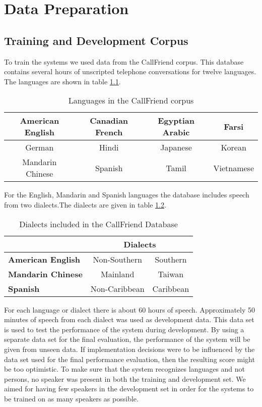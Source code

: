 \chapter{Data Preparation}

\section{Training and Development Corpus}

To train the systems we used data from the CallFriend corpus. This database contains several hours of unscripted telephone conversations for twelve languages. The languages are shown in table \ref{tab:callfriend}.
\begin{table}[hbt]
	\begin{center}
	\caption{Languages in the CallFriend corpus}
	\begin{tabular}{ | c | c | c | c |}
	\hline
	American English & Canadian French & Egyptian Arabic & Farsi \\ \hline
	German & Hindi & Japanese & Korean \\ \hline
	Mandarin Chinese & Spanish & Tamil & Vietnamese \\ \hline
	\hline
	\end{tabular}
	\label{tab:callfriend}
	\end{center}
\end{table}
For the English, Mandarin and Spanish languages the database includes speech from two dialects.The dialects are given in table \ref{tab:callfrienddial}.
\begin{table}[hbt]
	\begin{center}
	\caption{Dialects included in the CallFriend Database}
	\begin{tabular}{| l | c | c |}
		\cline{2-3}
		\multicolumn{1}{l}{}  & \multicolumn{2}{|c|}{\textbf{Dialects}} \\ \hline
		\textbf{American English} & Non-Southern & Southern \\ \hline 
		\textbf{Mandarin Chinese} & Mainland & Taiwan \\ \hline 
		\textbf{Spanish} & Non-Caribbean & Caribbean \\
		\hline
	\end{tabular}
	\label{tab:callfrienddial}
	\end{center}
\end{table}	
For each language or dialect there is about 60 hours of speech. Approximately 50 minutes of speech from each dialect was used as development data. This data set is used to test the performance of the system during development. By using a separate data set for the final evaluation, the performance of the system will be given from unseen data. If implementation decisions were to be influenced by the data set used for the final performance evaluation, then the resulting score might be too optimistic. To make sure that the system recognizes languages and not persons, no speaker was present in both the training and development set. We aimed for having few speakers in the development set in order for the systems to be trained on as many speakers as possible.

